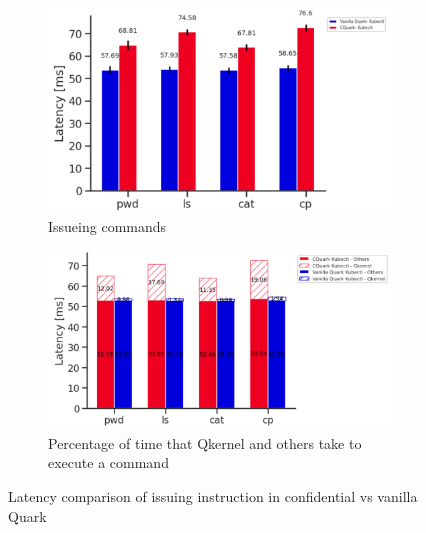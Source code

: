 \begin{figure}[!htb] 
    \begin{subfigure}[b]{0.5\linewidth}
      \centering
      \includegraphics[width=1\textwidth]{images/speed_of_issuing_cmd_in_cquark_upstream_quark.PNG} %
      \caption{Issueing commands}
      \label{fig:speed_of_issuing_cmd_in_cquark_upstream_quark}
      \vspace{4ex}
    \end{subfigure}%
    \begin{subfigure}[b]{0.5\linewidth}
      \centering
      \includegraphics[width=1\textwidth]{images/timeshare_issuing_cmd_in_cquark_upstream_quark_kubectl.png} %
        \caption{Percentage of time that Qkernel and others take to execute a command}
        \label{fig:timeshare_issuing_cmd_in_cquark_upstream_quark_kubectl}
      \vspace{4ex}
    \end{subfigure} 
    \caption{Latency comparison of issuing instruction in confidential vs vanilla Quark}
    \label{fig8} 
\end{figure}


